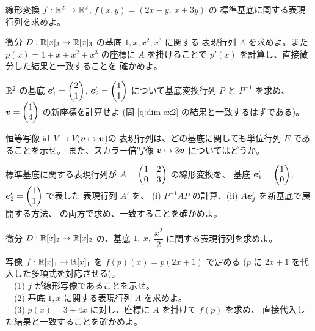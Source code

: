\begin{mondai}[基本]\label{q:repmat-ex1}
線形変換 $f : \mathbb{R}^2 \to \mathbb{R}^2$, $f(x, y) = (2x - y,\ x + 3y)$ の
標準基底に関する表現行列を求めよ。
\end{mondai}

\begin{mondai}[基本]\label{q:repmat-ex2}
微分 $D : \mathbb{R}[x]_3 \to \mathbb{R}[x]_3$ の基底 $1, x, x^2, x^3$ に関する
表現行列 $A$ を求めよ。また $p(x) = 1 + x + x^2 + x^3$ の座標に
$A$ を掛けることで $p'(x)$ を計算し、直接微分した結果と一致することを
確かめよ。
\end{mondai}

\begin{mondai}[基本]\label{q:repmat-ex3}
$\mathbb{R}^2$ の基底 $\bm{e}'_1 = \begin{pmatrix}2 \\ 1\end{pmatrix}$, $\bm{e}'_2 = \begin{pmatrix}1 \\ 1\end{pmatrix}$
について基底変換行列 $P$ と $P^{-1}$ を求め、
$\bm{v} = \begin{pmatrix}1 \\ 4\end{pmatrix}$ の新座標を計算せよ
(問 \ref{q:dim-ex2} の結果と一致するはずである)。
\end{mondai}

\begin{mondai}[基本]\label{q:repmat-ex4}
恒等写像 $\mathrm{id} : V \to V$($\bm{v} \mapsto \bm{v}$)の
表現行列は、どの基底に関しても単位行列 $E$ であることを示せ。
また、スカラー倍写像 $\bm{v} \mapsto 3\bm{v}$ についてはどうか。
\end{mondai}

\begin{mondai}[標準]\label{q:repmat-ex5}
標準基底に関する表現行列が $A = \begin{pmatrix}1 & 2 \\ 0 & 3\end{pmatrix}$ の線形変換を、
基底 $\bm{e}'_1 = \begin{pmatrix}1 \\ 0\end{pmatrix}$, $\bm{e}'_2 = \begin{pmatrix}1 \\ 1\end{pmatrix}$ で表した
表現行列 $A'$ を、
(i) $P^{-1}AP$ の計算、(ii) $A\bm{e}'_j$ を新基底で展開する方法、
の両方で求め、一致することを確かめよ。
\end{mondai}

\begin{mondai}[標準]\label{q:repmat-ex6}
微分 $D : \mathbb{R}[x]_2 \to \mathbb{R}[x]_2$ の、基底
$1,\ x,\ \dfrac{x^2}{2}$ に関する表現行列を求めよ。
\end{mondai}

\begin{mondai}[標準]\label{q:repmat-ex7}
写像 $f : \mathbb{R}[x]_1 \to \mathbb{R}[x]_1$ を $f(p)(x) = p(2x + 1)$ で定める
($p$ に $2x + 1$ を代入した多項式を対応させる)。\\
　(1) $f$ が線形写像であることを示せ。\\
　(2) 基底 $1, x$ に関する表現行列 $A$ を求めよ。\\
　(3) $p(x) = 3 + 4x$ に対し、座標に $A$ を掛けて $f(p)$ を求め、
直接代入した結果と一致することを確かめよ。
\end{mondai}

